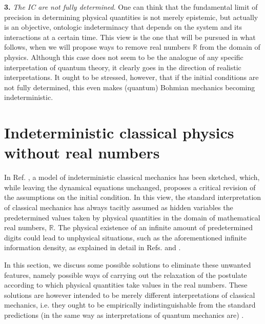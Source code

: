 \documentclass[aps,prl,twocolumn,showpacs,superscriptaddress,groupedaddress, nofootinbib]{revtex4-1}
\newcommand{\R}{\mathbb{R}}
\begin{document}
\textbf{3.} \emph{The IC \emph{are} not fully determined}. One can think that the fundamental limit of precision in determining physical quantities is not merely epistemic, but actually is an objective, ontologic indeterminacy that depends on the system and its interactions at a certain time. This view is the one that will be pursued in what follows, when we will propose ways to remove real numbers $\R$ from the domain of physics. Although this case does not seem to be the analogue of any specific interpretation of quantum theory, it clearly goes in the direction of realistic interpretations. It ought to be stressed, however, that if the initial conditions are not fully determined, this even makes (quantum) Bohmian mechanics becoming indeterministic. 




\section{Indeterministic classical physics without real numbers}
In Ref.  \cite{gisin1}, a model of indeterministic classical mechanics has been sketched, which, while leaving  the dynamical equations unchanged, proposes a critical revision of the assumptions on the initial condition. In this view, the standard interpretation of classical mechanics has always tacitly assumed as  hidden variables the predetermined values taken by physical quantities in the domain of mathematical real numbers,  $\R $.  The physical existence of an infinite amount of predetermined digits could lead to  unphysical situations, such as the aforementioned  infinite information density, as explained in detail in Refs. \cite{dowek} and \cite{gisin1}.

In this section, we discuss some possible solutions to eliminate these unwanted features, namely possible ways of carrying out the relaxation of the postulate according to which physical quantities take values in the real numbers. These solutions are however intended to be merely different interpretations of classical mechanics, i.e. they ought to be empirically indistinguishable from the standard predictions (in the same way as interpretations of quantum mechanics are) \cite{baumann}.
\end{document}

